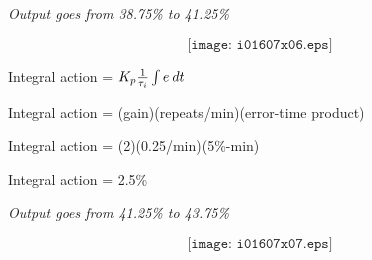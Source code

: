 \noindent
{\it Output goes from 38.75\% to 41.25\%}
 
$$\texttt{[image: i01607x06.eps]}$$
 
\filbreak 

Integral action = $K_p {1\over \tau_i} \int e \> dt$
 
\vskip 10pt

Integral action = (gain)(repeats/min)(error-time product)
 
\vskip 10pt

Integral action = (2)(0.25/min)(5\%-min)
 
\vskip 10pt

Integral action = 2.5\%
 
\vskip 10pt

\noindent
{\it Output goes from 41.25\% to 43.75\%}
 
$$\texttt{[image: i01607x07.eps]}$$











